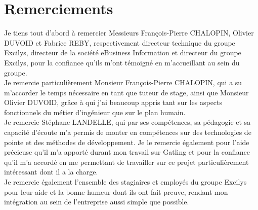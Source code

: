 \section*{Remerciements}

Je tiens tout d’abord à remercier Messieurs François-Pierre CHALOPIN, Olivier DUVOID et Fabrice REBY, respectivement directeur technique du groupe Excilys, directeur de la société eBusiness Information et directeur du groupe Excilys, pour la confiance qu’ils m’ont témoigné en m’accueillant au sein du groupe.\\

Je remercie particulièrement Monsieur François-Pierre CHALOPIN, qui a su m’accorder le temps nécessaire en tant que tuteur de stage, ainsi que Monsieur Olivier DUVOID, grâce à qui j’ai beaucoup appris tant sur les aspects fonctionnels du métier d’ingénieur que sur le plan humain.\\

Je remercie Stéphane LANDELLE, qui par ses compétences, sa pédagogie et sa capacité d’écoute m’a permis de monter en compétences sur des technologies de pointe et des méthodes de développement. Je le remercie également pour l'aide précieuse qu'il m'a apporté durant mon travail sur Gatling et pour la confiance qu'il m'a accordé en me permettant de travailler sur ce projet particulièrement intéressant dont il a la charge.\\

Je remercie également l'ensemble des stagiaires et employés du groupe Excilys pour leur aide et la bonne humeur dont ils ont fait preuve, rendant mon intégration au sein de l'entreprise aussi simple que possible.

 